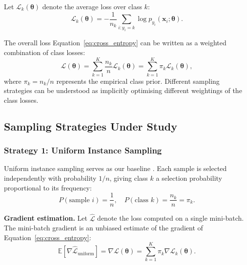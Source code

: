 \documentclass[12pt,a4paper]{article}
\newcommand{\E}{\mathbb{E}}
\newcommand{\bx}{\mathbf{x}}
\newcommand{\btheta}{\boldsymbol{\theta}}
\begin{document}
Let $\mathcal{L}_k(\btheta)$ denote the average loss over class $k$:
\begin{equation}
    \mathcal{L}_k(\btheta) = -\frac{1}{n_k} \sum_{i: y_i = k} \log p_{y_i}(\bx_i; \btheta).
    \label{eq:class_loss}
\end{equation}

The overall loss Equation~\eqref{eq:cross_entropy} can be written as a weighted combination of class losses:
\begin{equation}
    \mathcal{L}(\btheta) = \sum_{k=1}^{K} \frac{n_k}{n} \mathcal{L}_k(\btheta) = \sum_{k=1}^{K} \pi_k \mathcal{L}_k(\btheta),
    \label{eq:weighted_loss}
\end{equation}
where $\pi_k = n_k / n$ represents the empirical class prior. Different sampling strategies can be understood as implicitly optimising different weightings of the class losses.


\subsection{Sampling Strategies Under Study}
\subsubsection{Strategy 1: Uniform Instance Sampling}
\label{subsec:uniform_sampling}
Uniform instance sampling serves as our baseline \citep{bottou2018optimization}. Each sample is selected independently with probability $1/n$, giving class $k$ a selection probability proportional to its frequency:
\begin{equation}
    P(\text{sample } i) = \frac{1}{n}, \quad P(\text{class } k) = \frac{n_k}{n} = \pi_k.
    \label{eq:uniform_probs}
\end{equation}

\textbf{Gradient estimation.} Let $\hat{\mathcal{L}}$ denote the loss computed on a single mini-batch. The mini-batch gradient is an unbiased estimate of the gradient of Equation~\eqref{eq:cross_entropy}:
\begin{equation}
    \E[\nabla \hat{\mathcal{L}}_{\text{uniform}}] = \nabla \mathcal{L}(\btheta) = \sum_{k=1}^{K} \pi_k \nabla \mathcal{L}_k(\btheta).
    \label{eq:uniform_gradient}
\end{equation}
\end{document}
